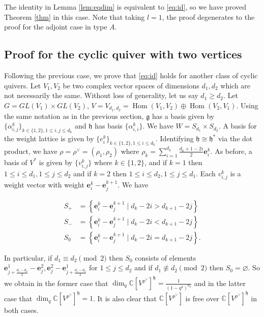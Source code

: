 \documentclass[12pt]{article}
\renewcommand{\b}[1]{\textbf{#1}}
\newcommand{\C}{\mathbb{C}}
\theoremstyle{definition}
\theoremstyle{remark}
\newcommand{\g}{\mathfrak{g}}
\newcommand{\h}{\mathfrak{h}}
\DeclareMathOperator{\Hom}{Hom}
\begin{document}
The identity in Lemma \ref{lem:eqdim} is equivalent to \eqref{eq:id}, so we have proved Theorem \ref{thm} in this case. Note that taking $l=1$, the proof degenerates to the proof for the adjoint case in type $A$.

\subsection{Proof for the cyclic quiver with two vertices}\label{sec:2vertex}

Following the previous case, we prove that \eqref{eq:id} holds for another class of cyclic quivers. Let $V_1,V_2$ be two complex vector spaces of dimensions $d_1,d_2$ which are not necessarily the same. Without loss of generality, let us say $d_1\geq d_2$. Let $G=GL(V_1)\times GL(V_2)$, $V=V_{d_1,d_2}=\Hom(V_1,V_2)\oplus\Hom(V_2,V_1)$. Using the same notation as in the previous section, $\g$ has a basis given by $\{\alpha^k_{i,j}\}_{k\in\{1,2\},1\leq i,j\leq d_k}$ and $\h$ has basis $\{\alpha^k_{i,i}\}$. We have $W=S_{d_1}\times S_{d_2}$. A basis for the weight lattice is given by $\{e_i^k\}_{k\in\{1,2\},1\leq i\leq d_k}$. Identifying $\h\cong\h^*$ via the dot product, we have $\rho=\rho^\vee=(\rho_1,\rho_2)$ where $\rho_k=\sum_{i=1}^{d_k}\frac{d_k+1-2i}{2}\b{e}_i^k$. As before, a basis of $V^*$ is given by $\{v_{i,j}^k\}$ where $k\in\{1,2\}$, and if $k=1$ then $1\leq i\leq d_1,1\leq j\leq d_2$ and if $k=2$ then $1\leq i\leq d_2,1\leq j\leq d_1$. Each $v_{i,j}^k$ is a weight vector with weight $\b{e}_i^k-\b{e}_j^{k+1}$. We have

\begin{align*}
    S_+&=\left\{\b{e}_i^k-\b{e}_j^{k+1}\mid d_k-2i >d_{k+1}-2j\right\}\\
    S_-&=\left\{\b{e}_i^k-\b{e}_j^{k+1}\mid d_k-2i<d_{k+1}-2j\right\}\\
    S_0&=\left\{\b{e}_i^k-\b{e}_j^{k+1}\mid d_k-2i=d_{k+1}-2j\right\}.
\end{align*}

In particular, if $d_1\equiv d_2\pmod{2}$ then $S_0$ consists of elements $\b{e}_{j+\frac{d_1-d_2}{2}}^1-\b{e}_j^2,\b{e}_j^2-\b{e}_{j+\frac{d_1-d_2}{2}}^1$ for $1\leq j\leq d_2$ and if $d_1\not\equiv d_2\pmod{2}$ then $S_0=\varnothing$. So we obtain in the former case that $\dim_q\C[V^{\rho^\vee}]^\h=\frac{1}{(1-q^2)^{d_2}}$ and in the latter case that $\dim_q\C[V^{\rho^\vee}]^\h=1$. It is also clear that $\C[V^{\rho^\vee}]$ is free over $\C[V^{\rho^\vee}]^\h$ in both cases.
\end{document}

